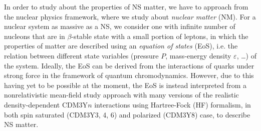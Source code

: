 In order to study about the properties of \gls{NS} matter, we have to approach from the nuclear physics framework, where we study about \emph{nuclear matter} (\gls{NM}). For a nuclear system as massive as a \gls{NS}, we consider one with infinite number of nucleons that are in $\beta$-stable state with a small portion of leptons, in which the properties of matter are described using an \emph{equation of states} (\gls{EoS}), i.e. the relation between different state variables (pressure $P$, mass-energy density $\varepsilon$, \ldots) of the system. Ideally, the \gls{EoS} can be derived from the interactions of quarks under strong force in the framework of quantum chromodynamics. However, due to this having yet to be possible at the moment, the \gls{EoS} is instead interpreted from a nonrelativistic mean-field study approach with many versions of the realistic density-dependent CDM3Y$n$ interactions \cite{khoa1995equation,khoa2007mean} using Hartree-Fock (\gls{HF}) formalism, in both spin saturated (CDM3Y3, 4, 6) and polarized (CDM3Y8) case, to describe \gls{NS} matter.


